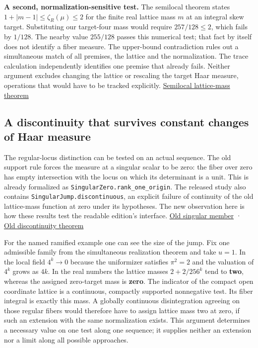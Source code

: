 \documentclass[11pt,letterpaper]{article}
\begin{document}
\textbf{A second, normalization-sensitive test.} The semilocal theorem states $1+|m-1|\le \zeta_R(\mu )\le 2$ for the finite real lattice mass $m$ at an integral skew target. Substituting our target-four mass would require $257/128\le 2$, which fails by $1/128$. The nearby value $255/128$ passes this numerical test; that fact by itself does not identify a fiber measure. The upper-bound contradiction rules out a simultaneous match of all premises, the lattice and the normalization. The trace calculation independently identifies one premise that already fails. Neither argument excludes changing the lattice or rescaling the target Haar measure, operations that would have to be tracked explicitly. \href{https://github.com/nousentllc/riemann-hypothesis/blob/e063a923620ee7787b4a1270421478645bf66bdb/src/Lib/SiegelWeil/OneVector/SemilocalDensityBounds.lean#L192-L202}{Semilocal lattice-mass theorem}

\subsection{A discontinuity that survives constant changes of Haar measure}

The regular-locus distinction can be tested on an actual sequence. The old support rule forces the measure at a singular scalar to be zero: the fiber over zero has empty intersection with the locus on which its determinant is a unit. This is already formalized as \nolinkurl{SingularZero.rank_one_origin}. The released study also contains \nolinkurl{SingularJump.discontinuous}, an explicit failure of continuity of the old lattice-mass function at zero under its hypotheses. The new observation here is how these results test the readable edition's interface. \href{https://github.com/nousentllc/riemann-hypothesis/blob/17263859a4d27c62cfc67571737355f61a080806/research/uriel/experiments/ramified-square-dilates/local/SingularZero.lean}{Old singular member} · \href{https://github.com/nousentllc/riemann-hypothesis/blob/17263859a4d27c62cfc67571737355f61a080806/research/uriel/experiments/ramified-square-dilates/local/SingularJump.lean}{Old discontinuity theorem}

For the named ramified example one can see the size of the jump. Fix one admissible family from the simultaneous realization theorem and take $u=1$. In the local field $4^k\to0$ because the uniformizer satisfies $\pi^2=2$ and the valuation of $4^k$ grows as $4k$. In the real numbers the lattice masses $2+2/256^k$ tend to \textbf{two}, whereas the assigned zero-target mass is \textbf{zero}. The indicator of the compact open coordinate lattice is a continuous, compactly supported nonnegative test. Its fiber integral is exactly this mass. A globally continuous disintegration agreeing on those regular fibers would therefore have to assign lattice mass two at zero, if such an extension with the same normalization exists. This argument determines a necessary value on one test along one sequence; it supplies neither an extension nor a limit along all possible approaches.
\end{document}
